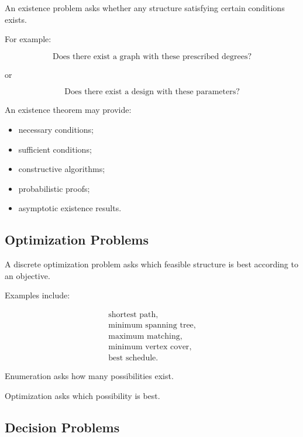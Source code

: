 An existence problem asks whether any structure satisfying certain
conditions exists.

For example:

\[
\boxed{
\text{Does there exist a graph with these prescribed degrees?}
}
\]

or

\[
\boxed{
\text{Does there exist a design with these parameters?}
}
\]

An existence theorem may provide:

\begin{itemize}
    \item necessary conditions;
    \item sufficient conditions;
    \item constructive algorithms;
    \item probabilistic proofs;
    \item asymptotic existence results.
\end{itemize}

\subsection{Optimization Problems}
\label{subsec:optimization-discrete-overview}

A discrete optimization problem asks which feasible structure is best
according to an objective.

Examples include:

\[
\boxed{
\begin{array}{c}
\text{shortest path},\\
\text{minimum spanning tree},\\
\text{maximum matching},\\
\text{minimum vertex cover},\\
\text{best schedule}.
\end{array}
}
\]

Enumeration asks how many possibilities exist.

Optimization asks which possibility is best.

\subsection{Decision Problems}
\label{subsec:decision-problems-discrete}

